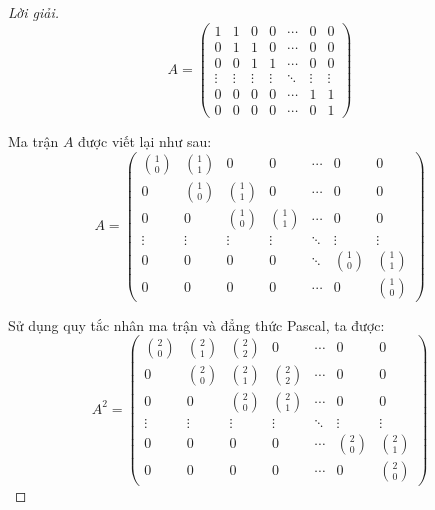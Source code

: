 \begin{proof}[Lời giải]
    \[
        A =
        \begin{pmatrix}
            1      & 1      & 0      & 0      & \cdots & 0      & 0      \\
            0      & 1      & 1      & 0      & \cdots & 0      & 0      \\
            0      & 0      & 1      & 1      & \cdots & 0      & 0      \\
            \vdots & \vdots & \vdots & \vdots & \ddots & \vdots & \vdots \\
            0      & 0      & 0      & 0      & \cdots & 1      & 1      \\
            0      & 0      & 0      & 0      & \cdots & 0      & 1
        \end{pmatrix}
    \]
    
    Ma trận $A$ được viết lại như sau:
    \[
        A =
        \begin{pmatrix}
            \binom{1}{0} & \binom{1}{1} & 0            & 0            & \cdots & 0            & 0            \\
            0            & \binom{1}{0} & \binom{1}{1} & 0            & \cdots & 0            & 0            \\
            0            & 0            & \binom{1}{0} & \binom{1}{1} & \cdots & 0            & 0            \\
            \vdots       & \vdots       & \vdots       & \vdots       & \ddots & \vdots       & \vdots       \\
            0            & 0            & 0            & 0            & \ddots & \binom{1}{0} & \binom{1}{1} \\
            0            & 0            & 0            & 0            & \cdots & 0            & \binom{1}{0}
        \end{pmatrix}
    \]
    
    Sử dụng quy tắc nhân ma trận và đẳng thức Pascal, ta được:
    \[
        A^{2} =
        \begin{pmatrix}
            \binom{2}{0} & \binom{2}{1} & \binom{2}{2} & 0            & \cdots & 0            & 0            \\
            0            & \binom{2}{0} & \binom{2}{1} & \binom{2}{2} & \cdots & 0            & 0            \\
            0            & 0            & \binom{2}{0} & \binom{2}{1} & \cdots & 0            & 0            \\
            \vdots       & \vdots       & \vdots       & \vdots       & \ddots & \vdots       & \vdots       \\
            0            & 0            & 0            & 0            & \cdots & \binom{2}{0} & \binom{2}{1} \\
            0            & 0            & 0            & 0            & \cdots & 0            & \binom{2}{0}
        \end{pmatrix}
    \]
    

\end{proof}
